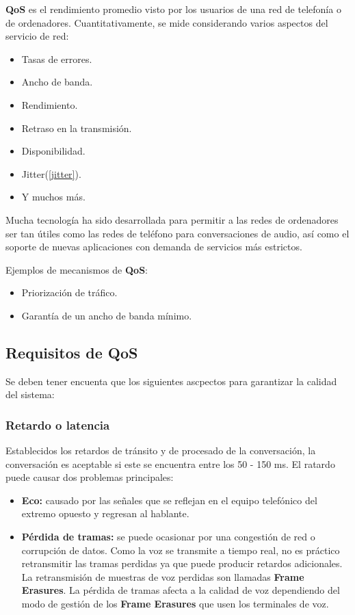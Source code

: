 \documentclass[a4paper, 11pt]{article} %
\begin{document}
		\textbf{QoS} es el rendimiento promedio visto por los usuarios de una red de telefonía o de ordenadores. Cuantitativamente, se mide considerando varios aspectos del servicio de red:
		\begin{itemize}
			\item Tasas de errores.
			\item Ancho de banda.
			\item Rendimiento.
			\item Retraso en la transmisión.
			\item Disponibilidad.
			\item Jitter(\ref{jitter}).
			\item Y muchos más.
		\end{itemize}
		
		Mucha tecnología ha sido desarrollada para permitir a las redes de ordenadores ser tan útiles como las redes de teléfono para conversaciones de audio, así como el soporte de nuevas aplicaciones con demanda de servicios más estrictos.
		
		Ejemplos de mecanismos de \textbf{QoS}:
		\begin{itemize}
			\item Priorización de tráfico.
			\item Garantía de un ancho de banda mínimo.
		\end{itemize}
	
	\subsection{Requisitos de QoS}
	Se deben tener encuenta que los siguientes ascpectos para garantizar la calidad del sistema:
		
		\subsubsection{Retardo o latencia}
		Establecidos los retardos de tránsito y de procesado de la conversación, la conversación es aceptable si este se encuentra entre los 50 - 150 ms. 
		El ratardo puede causar dos problemas principales:
		\begin{itemize}
			\item \textbf{Eco:} causado por las señales que se reflejan en el equipo telefónico del extremo opuesto y regresan al hablante.
			\item \textbf{Pérdida de tramas:} se puede ocasionar por una congestión de red o corrupción de datos. Como la voz se transmite a tiempo real, no es práctico retransmitir las tramas perdidas ya que puede producir retardos adicionales. La retransmisión de muestras de voz perdidas son llamadas \textbf{Frame Erasures}. La pérdida de tramas afecta a la calidad de voz dependiendo del modo de gestión de los \textbf{Frame Erasures} que usen los terminales de voz.
		\end{itemize}
		
\end{document}
